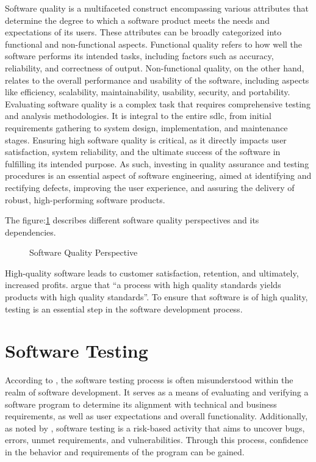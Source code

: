 Software quality is a multifaceted construct encompassing various attributes
that determine the degree to which a software product meets the needs and expectations
of its users\cite{boehm1976quantitative}. These attributes can be broadly categorized into
functional and non-functional aspects. Functional quality refers to how well the
software performs its intended tasks, including factors such as accuracy, reliability,
and correctness of output\cite{kiruthika2015software}. Non-functional quality,
on the other hand, relates to the overall performance and usability of the software,
including aspects like efficiency, scalability, maintainability, usability,
security, and portability\cite{chung2012non}. Evaluating software quality
is a complex task that requires comprehensive testing and analysis methodologies. It is integral
to the entire \acrshort{sdlc}, from initial requirements gathering to system design,
implementation, and maintenance stages. Ensuring high software quality is critical, as it
directly impacts user satisfaction, system reliability, and the ultimate success of
the software in fulfilling its intended purpose. As such, investing in quality assurance and
testing procedures is an essential aspect of software engineering, aimed at identifying and
rectifying defects, improving the user experience, and assuring the delivery of robust,
high-performing software products\cite{cavano1978framework}.

The figure:\ref{fig:software_quality_perspective_1} describes different software quality perspectives
and its dependencies.

\begin{figure}[h]
    \centering
    \caption{Software Quality Perspective}\label{fig:software_quality_perspective_1}
\end{figure}

High-quality software leads to customer satisfaction, retention, and ultimately, increased profits.
\citeauthor{8748529} argue that ``a process with high quality standards yields products with high
quality standards''.
To ensure that software is of high quality, testing is an essential step in the software development
process\cite{8748529}.

\section{Software Testing}

According to \citeauthor{whittaker2000software}, the software testing process is often misunderstood
within the realm of software development\cite{whittaker2000software}. It serves as a means of
evaluating and verifying a software program to determine its alignment with technical and business
requirements, as well as user expectations and overall functionality\cite{bentley2005software}.
Additionally, as noted by \citeauthor{jamil2016software}, software testing is a risk-based activity
that aims to uncover bugs, errors, unmet requirements, and vulnerabilities. Through this process,
confidence in the behavior and requirements of the program can be gained\cite{jamil2016software}.


